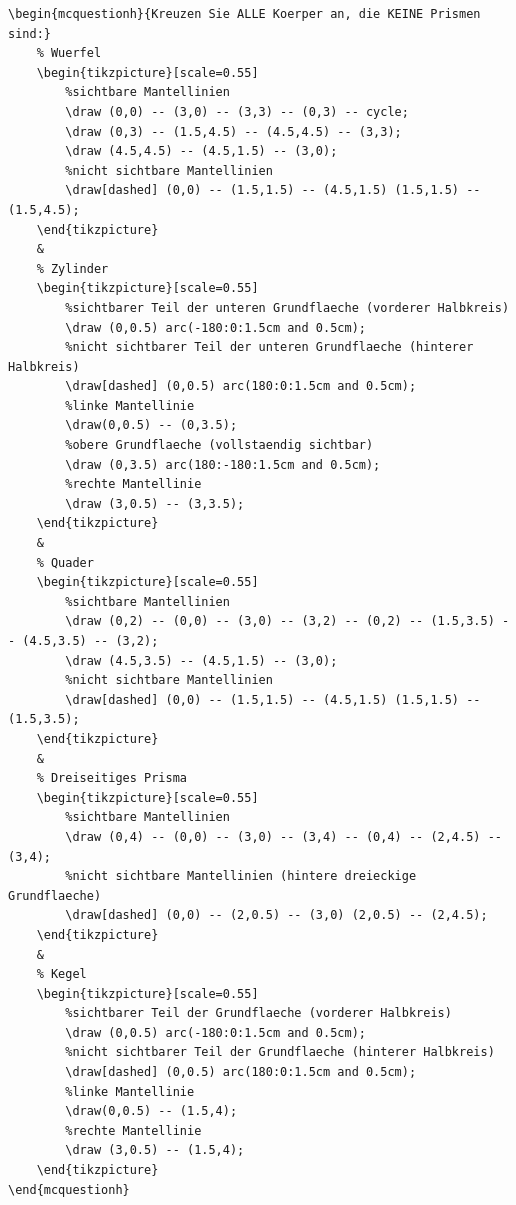 \begin{lstlisting}[style=latex]
\begin{mcquestionh}{Kreuzen Sie ALLE Koerper an, die KEINE Prismen sind:}
	% Wuerfel
	\begin{tikzpicture}[scale=0.55]
		%sichtbare Mantellinien
		\draw (0,0) -- (3,0) -- (3,3) -- (0,3) -- cycle;
		\draw (0,3) -- (1.5,4.5) -- (4.5,4.5) -- (3,3);
		\draw (4.5,4.5) -- (4.5,1.5) -- (3,0);
		%nicht sichtbare Mantellinien
		\draw[dashed] (0,0) -- (1.5,1.5) -- (4.5,1.5) (1.5,1.5) -- (1.5,4.5);
	\end{tikzpicture}
	&
	% Zylinder
	\begin{tikzpicture}[scale=0.55]
		%sichtbarer Teil der unteren Grundflaeche (vorderer Halbkreis)
		\draw (0,0.5) arc(-180:0:1.5cm and 0.5cm);
		%nicht sichtbarer Teil der unteren Grundflaeche (hinterer Halbkreis)
		\draw[dashed] (0,0.5) arc(180:0:1.5cm and 0.5cm);
		%linke Mantellinie
		\draw(0,0.5) -- (0,3.5);
		%obere Grundflaeche (vollstaendig sichtbar)
		\draw (0,3.5) arc(180:-180:1.5cm and 0.5cm);
		%rechte Mantellinie
		\draw (3,0.5) -- (3,3.5);
	\end{tikzpicture}
	&
	% Quader
	\begin{tikzpicture}[scale=0.55]
		%sichtbare Mantellinien
		\draw (0,2) -- (0,0) -- (3,0) -- (3,2) -- (0,2) -- (1.5,3.5) -- (4.5,3.5) -- (3,2);
		\draw (4.5,3.5) -- (4.5,1.5) -- (3,0);
		%nicht sichtbare Mantellinien
		\draw[dashed] (0,0) -- (1.5,1.5) -- (4.5,1.5) (1.5,1.5) -- (1.5,3.5);
	\end{tikzpicture}
	&
	% Dreiseitiges Prisma
	\begin{tikzpicture}[scale=0.55]
		%sichtbare Mantellinien
		\draw (0,4) -- (0,0) -- (3,0) -- (3,4) -- (0,4) -- (2,4.5) -- (3,4);
		%nicht sichtbare Mantellinien (hintere dreieckige Grundflaeche)
		\draw[dashed] (0,0) -- (2,0.5) -- (3,0) (2,0.5) -- (2,4.5);
	\end{tikzpicture}
	&
	% Kegel
	\begin{tikzpicture}[scale=0.55]
		%sichtbarer Teil der Grundflaeche (vorderer Halbkreis)
		\draw (0,0.5) arc(-180:0:1.5cm and 0.5cm);
		%nicht sichtbarer Teil der Grundflaeche (hinterer Halbkreis)
		\draw[dashed] (0,0.5) arc(180:0:1.5cm and 0.5cm);
		%linke Mantellinie
		\draw(0,0.5) -- (1.5,4);
		%rechte Mantellinie
		\draw (3,0.5) -- (1.5,4);
	\end{tikzpicture}
\end{mcquestionh}
\end{lstlisting}

